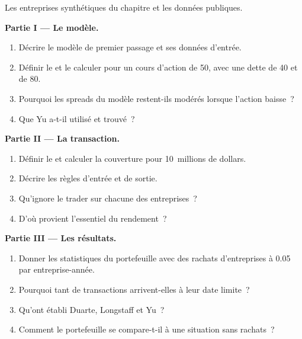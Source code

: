 \begin{problem}\label{pb:s2:capital-structure-arbitrage:1}
Les entreprises synthétiques du chapitre et les données publiques.

\medskip\noindent\textbf{Partie I --- Le modèle.}
\begin{enumerate}
\item Décrire le modèle de premier passage et ses données d'entrée.
\item Définir le  et le calculer pour un cours d'action de 50, avec une dette de 40 et de 80.
\item Pourquoi les spreads du modèle restent-ils modérés lorsque l'action baisse~?
\item Que Yu a-t-il utilisé et trouvé~?
\end{enumerate}

\medskip\noindent\textbf{Partie II --- La transaction.}
\begin{enumerate}[resume]
\item Définir le  et calculer la couverture pour 10~millions de dollars.
\item Décrire les règles d'entrée et de sortie.
\item Qu'ignore le trader sur chacune des entreprises~?
\item D'où provient l'essentiel du rendement~?
\end{enumerate}

\medskip\noindent\textbf{Partie III --- Les résultats.}
\begin{enumerate}[resume]
\item Donner les statistiques du portefeuille avec des rachats d'entreprises à 0.05 par entreprise-année.
\item Pourquoi tant de transactions arrivent-elles à leur date limite~?
\item Qu'ont établi Duarte, Longstaff et Yu~?
\item Comment le portefeuille se compare-t-il à une situation sans rachats~?
\end{enumerate}


\end{problem}
